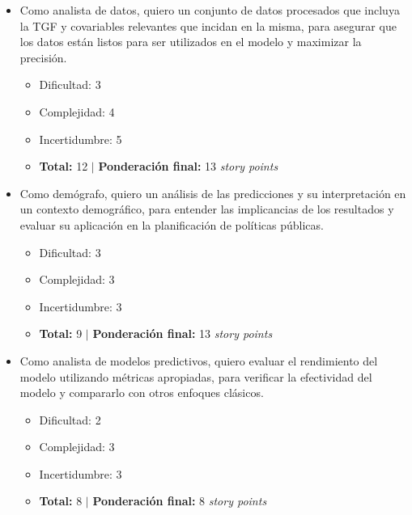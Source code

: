 \documentclass[
11pt, %
]{charter}
\begin{document}
\begin{itemize}
	\item Como analista de datos, quiero un conjunto de datos procesados que incluya la TGF y covariables relevantes que incidan en la misma, para asegurar que los datos están listos para ser utilizados en el modelo y maximizar la precisión.
	\begin{itemize}
		\item Dificultad: 	3
		\item Complejidad: 	4
		\item Incertidumbre: 5
		\item \textbf{Total:} 12 $|$ \textbf{Ponderación final:} 13 \textit{story points}
	\end{itemize}
\end{itemize}

\begin{itemize}
	\item Como demógrafo, quiero un análisis de las predicciones y su interpretación en un contexto demográfico, para entender las implicancias de los resultados y evaluar su aplicación en la planificación de políticas públicas.
	\begin{itemize}
		\item Dificultad: 	3
		\item Complejidad: 	3
		\item Incertidumbre: 3
		\item \textbf{Total:} 9 $|$ \textbf{Ponderación final:} 13 \textit{story points}
	\end{itemize}
\end{itemize}

\begin{itemize}
	\item Como analista de modelos predictivos, quiero evaluar el rendimiento del modelo utilizando métricas apropiadas, para verificar la efectividad del modelo y compararlo con otros enfoques clásicos.
	\begin{itemize}
		\item Dificultad: 	2
		\item Complejidad: 	3
		\item Incertidumbre: 3
		\item \textbf{Total:} 8 $|$ \textbf{Ponderación final:} 8 \textit{story points}
	\end{itemize}
\end{itemize}
\end{document}
